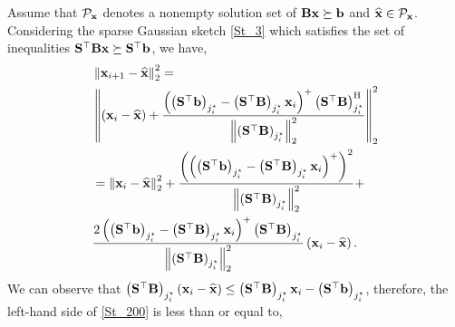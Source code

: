\documentclass[12pt,draftcls,onecolumn]{IEEEtran}
\begin{document}
Assume that $\mathcal{P}_{\mathbf{x}}$ denotes a nonempty solution set of $\mathbf{B}\mathbf{x}\succeq\mathbf{b}$ and $\widehat{\mathbf{x}}\in\mathcal{P}_{\mathbf{x}}$.
 Considering the sparse Gaussian sketch \eqref{St_3} which satisfies the set of inequalities $\mathbf{S}^{\top}\mathbf{B}\mathbf{x}\succeq\mathbf{S}^{\top}\mathbf{b}$, we have,
%
\begin{equation}
\label{St_200}
\begin{aligned}
&\left\|\mbx_{i+1}-\widehat{\mbx}\right\|_2^2=\\
&\left\|\left(\mbx_i-\widehat{\mbx}\right)+\frac{\left(\left(\mbS^{\top} \mbb\right)_{j^{\star}_{i}}-\left(\mbS^{\top}\mbB\right)_{j^{\star}_{i}}\mbx_{i}\right)^{+} \left(\mbS^{\top}\mbB\right)^{\mathrm{H}}_{j^{\star}_{i}}}{\left\|\left(\mbS^{\top}\mbB\right)_{j^{\star}_{i}}\right\|^2_2}\right\|^2_2\\
&=\left\|\mbx_i-\widehat{\mbx}\right\|^2_2+\frac{\left(\left(\left(\mbS^{\top} \mbb\right)_{j^{\star}_{i}}-\left(\mbS^{\top}\mbB\right)_{j^{\star}_{i}}\mbx_{i}\right)^{+}\right)^2}{\left\|\left(\mbS^{\top}\mbB\right)_{j^{\star}_{i}}\right\|^2_2}+\\&\frac{2\left(\left(\mbS^{\top} \mbb\right)_{j^{\star}_{i}}-\left(\mbS^{\top}\mbB\right)_{j^{\star}_{i}}\mbx_{i}\right)^{+}\left(\mbS^{\top}\mbB\right)_{j^{\star}_{i}}}{\left\|\left(\mbS^{\top}\mbB\right)_{j^{\star}_{i}}\right\|^2_2}\left(\mbx_i-\widehat{\mbx}\right).
\end{aligned}
\end{equation}
We can observe that $\left(\mathbf{S}^{\top}\mathbf{B}\right)_{j^{\star}_{i}}\left(\mathbf{x}_i-\widehat{\mathbf{x}}\right)\leq\left(\mathbf{S}^{\top}\mathbf{B}\right)_{j^{\star}_{i}}\mathbf{x}_i-\left(\mathbf{S}^{\top} \mathbf{b}\right)_{j^{\star}_{i}}$, therefore, the left-hand side of \eqref{St_200} is less than or equal to, %
\end{document}
